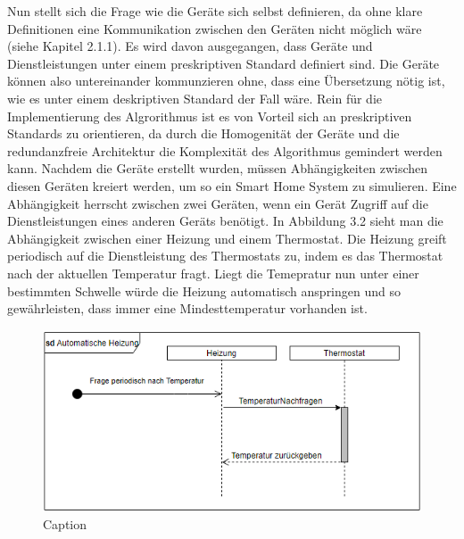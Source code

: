 Nun stellt sich die Frage wie die Geräte sich selbst definieren, da ohne klare Definitionen eine Kommunikation zwischen den Geräten nicht
möglich wäre (siehe Kapitel 2.1.1). Es wird davon ausgegangen, dass Geräte und  Dienstleistungen unter einem preskriptiven Standard
definiert sind. Die Geräte können also untereinander kommunzieren ohne, dass eine Übersetzung nötig ist, wie es unter einem deskriptiven
Standard der Fall wäre. Rein für die Implementierung des Algrorithmus ist es von Vorteil sich an preskriptiven Standards zu orientieren, 
da durch die Homogenität der Geräte und die redundanzfreie Architektur die Komplexität des Algorithmus gemindert werden kann.
Nachdem die Geräte erstellt wurden, müssen Abhängigkeiten zwischen diesen Geräten kreiert werden, um 
so ein Smart Home System zu simulieren. Eine Abhängigkeit herrscht zwischen zwei Geräten, wenn ein Gerät Zugriff auf die
Dienstleistungen eines anderen Geräts benötigt. In Abbildung 3.2 sieht man die Abhängigkeit zwischen einer Heizung und einem Thermostat.
Die Heizung greift periodisch auf die Dienstleistung des Thermostats zu, indem es das Thermostat nach der aktuellen Temperatur fragt.
Liegt die Temepratur nun unter einer bestimmten Schwelle würde die Heizung automatisch anspringen und so gewährleisten, dass immer eine
Mindesttemperatur vorhanden ist.
\newpage
\begin{figure}[h]
\centering
\includegraphics{"Heizung"}
\caption{Caption}
\label{fig:Prob1:MEA}
\end{figure}

